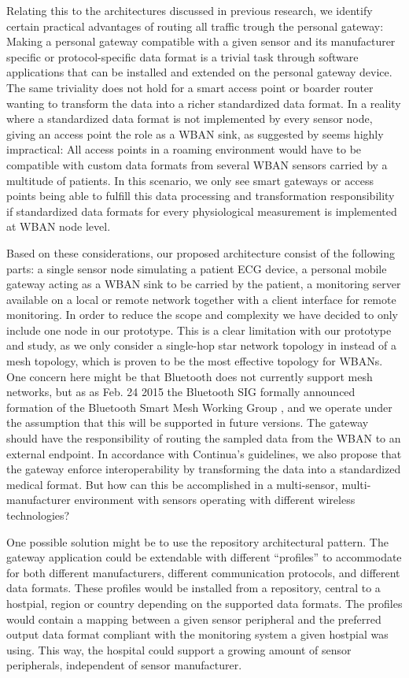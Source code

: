 Relating this to the architectures discussed in previous research, we identify certain practical advantages of routing all traffic trough the personal gateway: Making a personal gateway compatible with a given sensor and its manufacturer specific or protocol-specific data format is a trivial task through software applications that can be installed and extended on the personal gateway device. The same triviality does not hold for a smart access point or boarder router wanting to transform the data into a richer standardized data format. In a reality where a standardized data format is not implemented by every sensor node, giving an access point the role as a WBAN sink, as suggested by \cite{DrAmirMohammadRahmani:2014vx} seems highly impractical: All access points in a roaming environment would have to be compatible with custom data formats from several WBAN sensors carried by a multitude of patients. In this scenario, we only see smart gateways or access points being able to fulfill this data processing and transformation responsibility if standardized data formats for every physiological measurement is implemented at WBAN node level.

Based on these considerations, our proposed architecture consist of the following parts: a single sensor node simulating a patient ECG device, a personal mobile gateway acting as a WBAN sink to be carried by the patient, a monitoring server available on a local or remote network together with a client interface for remote monitoring. In order to reduce the scope and complexity we have decided to only include one node in our prototype. This is a clear limitation with our prototype and study, as we only consider a single-hop star network topology in instead of a mesh topology, which is proven to be the most effective topology for WBANs. One concern here might be that Bluetooth does not currently support mesh networks, but as as Feb. 24 2015 the Bluetooth SIG formally announced formation of the Bluetooth Smart Mesh Working Group \cite{bt:sig:mesh}, and we operate under the assumption that this will be supported in future versions. The gateway should have the responsibility of routing the sampled data from the WBAN to an external endpoint. In accordance with Continua's guidelines, we also propose that the gateway enforce interoperability by transforming the data into a standardized medical format. But how can this be accomplished in a multi-sensor, multi-manufacturer environment with sensors operating with different wireless technologies? 

One possible solution might be to use the repository architectural pattern. The gateway application could be extendable with different ``profiles'' to accommodate for both different manufacturers,  different communication protocols, and different data formats. These profiles would be installed from a repository, central to a hostpial, region or country depending on the supported data formats. The profiles would contain a mapping between a given sensor peripheral and the preferred output data format compliant with the monitoring system a given hostpial was using. This way, the hospital could support a growing amount of sensor peripherals, independent of sensor manufacturer.

